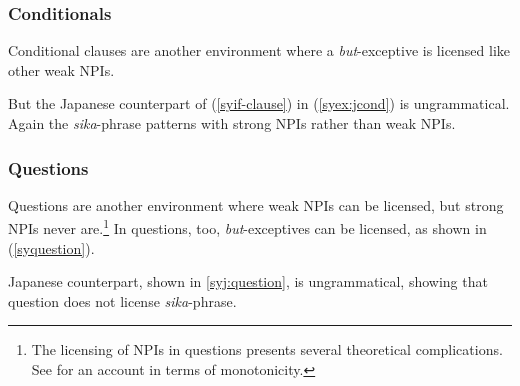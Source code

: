 \documentclass[output=paper]{langscibook}
\begin{document}



   
\subsubsection{Conditionals}
Conditional clauses are another environment where a \emph{but}-exceptive is licensed like other weak NPIs.

\z

But the Japanese counterpart of (\ref{syif-clause}) in (\ref{syex:jcond}) is ungrammatical.  Again the \emph{sika}-phrase patterns with strong NPIs rather than weak NPIs.

\z

\subsubsection{Questions}
Questions are another environment where weak NPIs can be licensed, but strong NPIs never are.\footnote{The licensing of NPIs in questions presents several theoretical complications.  See \citet{nicolae15b} for an account in terms of monotonicity.} In questions, too, \emph{but}-exceptives can be licensed, as shown in (\ref{syquestion}).

\z
Japanese counterpart, shown in \ref{syj:question}, is ungrammatical, showing that question does not license \emph{sika}-phrase.

\z
\end{document}
